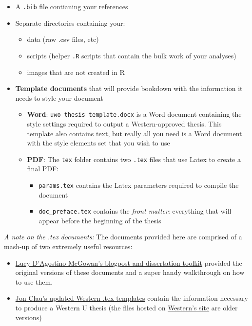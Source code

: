 \documentclass[
  12pt,
  oneside]{book}
\providecommand{\tightlist}{%
  \setlength{\itemsep}{0pt}\setlength{\parskip}{0pt}}
\numberwithin{figure}{chapter}
\begin{document}
\begin{itemize}
\tightlist
\item
  A \texttt{.bib} file contianing your references
\item
  Separate directories containing your:

  \begin{itemize}
  \tightlist
  \item
    data (raw .csv files, etc)
  \item
    scripts (helper \texttt{.R} scripts that contain the bulk work of your analyses)
  \item
    images that are not created in R
  \end{itemize}
\item
  \textbf{Template documents} that will provide bookdown with the information it needs to style your document

  \begin{itemize}
  \tightlist
  \item
    \textbf{Word}: \texttt{uwo\_thesis\_template.docx} is a Word document containing the style settings required to output a Western-approved thesis. This template also contains text, but really all you need is a Word document with the style elements set that you wish to use
  \item
    \textbf{PDF}: The \texttt{tex} folder contains two \texttt{.tex} files that use Latex to create a final PDF:

    \begin{itemize}
    \tightlist
    \item
      \texttt{params.tex} contains the Latex parameters required to compile the document
    \item
      \texttt{doc\_preface.tex} contains the \emph{front matter}: everything that will appear before the beginning of the thesis
    \end{itemize}
  \end{itemize}
\end{itemize}

\emph{A note on the .tex documents:} The documents provided here are comprised of a mash-up of two extremely useful resources:

\begin{itemize}
\tightlist
\item
  \href{https://livefreeordichotomize.com/2018/09/14/one-year-to-dissertate/}{Lucy D'Agostino McGowan's blogpost and dissertation toolkit} provided the original versions of these documents and a super handy walkthrough on how to use them.
\item
  \href{https://github.com/jclauneuro/thesis_template}{Jon Clau's updated Western .tex templates} contain the information necessary to produce a Western U thesis (the files hosted on \href{https://grad.uwo.ca/academics/thesis/formatting.html}{Western's site} are older versions)
\end{itemize}
\end{document}
